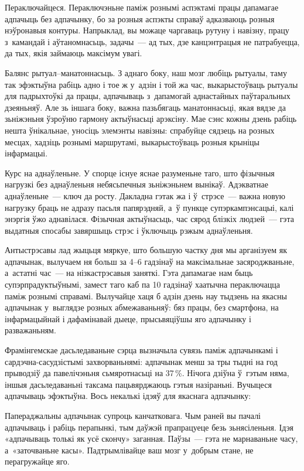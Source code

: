 Пераключайцеся. Пераключэньне паміж рознымі аспэктамі працы дапамагае адпачыць без адпачынку, бо за розныя аспэкты справаў адказваюць розныя нэўронавыя контуры. Напрыклад, вы можаце чаргаваць рутуну і навізну, працу з~камандай і аўтаномнасьць, задачы~--- ад тых, дзе канцэнтрацыя не патрабуецца, да тых, якія займаюць максімум увагі.

Балянс рытуал--манатоннасьць. З аднаго боку, наш мозг любіць рытуалы, таму так эфэктыўна рабіць адно і тое ж у~адзін і той жа час, выкарыстоўваць рытуалы для падрыхтоўкі да працы, адпачываць з~дапамогай аднастайных паўтаральных дзеяньняў. Але зь іншага боку, важна пазьбягаць манатоннасьці, якая вядзе да зьніжэньня ўзроўню гармону актыўнасьці арэксіну. Мае сэнс кожны дзень рабіць нешта ўнікальнае, уносіць элемэнты навізны: спрабуйце сядзець на розных месцах, хадзіць рознымі маршрутамі, выкарыстоўваць розныя крыніцы інфармацыі.

Курс на аднаўленьне. У спорце існуе яснае разуменьне таго, што фізычныя нагрузкі без аднаўленьня небясьпечныя зьніжэньнем вынікаў. Адэкватнае аднаўленьне~--- ключ да росту. Дакладна гэтак жа і ў~стрэсе~--- важна новую нагрузку браць не адразу пасьля папярэдняй, а~ў пункце супэркампэнсацыі, калі энэргія ўжо аднавілася. Фізычная актыўнасьць, час сярод блізкіх людзей~--- гэта выдатныя спосабы завяршыць стрэс і ўключыць рэжым аднаўленьня.

Антыстрэсавы лад жыцьця мяркуе, што большую частку дня мы арганізуем як адпачынак, вылучаем ня больш за 4--6 гадзінаў на максімальнае засяроджваньне, а~астатні час~--- на нізкастрэсавыя заняткі. Гэта дапамагае нам быць супэрпрадуктыўнымі, замест таго каб па 10 гадзінаў хаатычна пераключацца паміж рознымі справамі. Вылучайце хаця б адзін дзень нау тыдзень на якасны адпачынак у~выглядзе розных абмежаваньняў: бяз працы, без смартфона, на інфармацыйнай і дафамінавай дыеце, прысьвяціўшы яго адпачынку і разважаньням.

Фрамінгемскае дасьледаваньне сэрца вызначыла сувязь паміж адпачынкамі і сардэчна-сасудзістымі захворваньнямі: адпачынак менш за тры тыдні на год прыводзіў да павелічэньня сьмяротнасьці на 37\,\%. Нічога дзіўна ў~гэтым няма, іншыя дасьледаваньні таксама пацьвярджаюць гэтыя назіраньні. Вучыцеся адпачываць эфэктыўна. Вось некалькі ідэяў для якаснага адпачынку:

Папераджальны адпачынак супроць канчатковага. Чым раней вы пачалі адпачываць і рабіць перапынкі, тым даўжэй прапрацуеце безь зьнясіленьня. Ідэя «адпачываць толькі як усё скончу» заганная. Паўзы~--- гэта не марнаваньне часу, а~«заточваньне касы». Падтрымлівайце ваш мозг у~добрым стане, не перагружайце яго.

